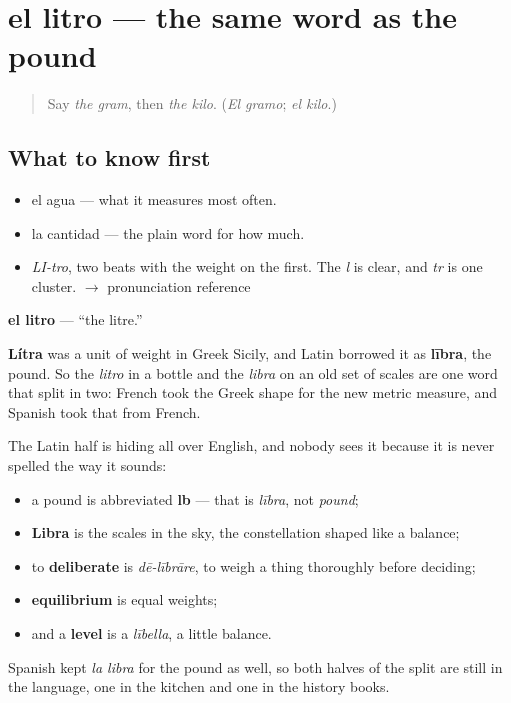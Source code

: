 \section[el litro]{el litro — the same word as the pound}

\label{lesson:ES-C359-litro}



\begin{quote}
Say \emph{the gram}, then \emph{the kilo}. (\emph{El gramo}; \emph{el kilo}.)
\end{quote}

\subsection*{What to know first}
\begin{itemize}
\raggedright
  \item el agua — what it measures most often.
  \item la cantidad — the plain word for how much.
\end{itemize}

\begin{sounds}
\begin{itemize}
\raggedright
  \item \emph{LI-tro}, two beats with the weight on the first. The \emph{l} is clear, and \emph{tr} is one cluster. $\to$ pronunciation reference
\end{itemize}
\end{sounds}

\begin{cousinweb}
\textbf{el litro} — \textquotedblleft{}the litre.\textquotedblright{}

\textbf{Lítra} was a unit of weight in Greek Sicily, and Latin borrowed it as \textbf{lībra}, the pound. So the \emph{litro} in a bottle and the \emph{libra} on an old set of scales are one word that split in two: French took the Greek shape for the new metric measure, and Spanish took that from French.

The Latin half is hiding all over English, and nobody sees it because it is never spelled the way it sounds:

\begin{itemize}
\raggedright
  \item a pound is abbreviated \textbf{lb} — that is \emph{lībra}, not \emph{pound};
  \item \textbf{Libra} is the scales in the sky, the constellation shaped like a balance;
  \item to \textbf{deliberate} is \emph{dē-lībrāre}, to weigh a thing thoroughly before deciding;
  \item \textbf{equilibrium} is equal weights;
  \item and a \textbf{level} is a \emph{lībella}, a little balance.
\end{itemize}

Spanish kept \emph{la libra} for the pound as well, so both halves of the split are still in the language, one in the kitchen and one in the history books.
\end{cousinweb}


